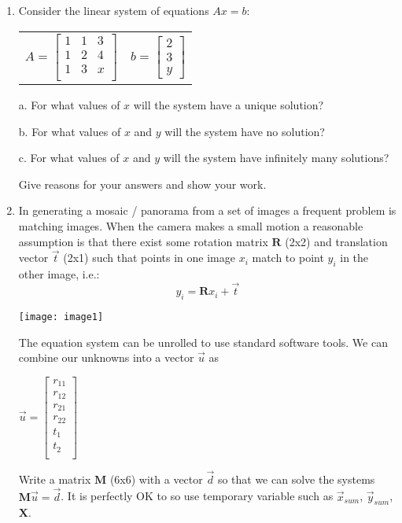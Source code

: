 \documentclass[12pt]{article}
\begin{document}
\begin{enumerate}
\item Consider the linear system of equations $Ax = b$:
  \begin{center}
    \begin{tabular}{cc}
      $
      A = \left[\begin{array}{ccc} 1 & 1 & 3 \\ 1 & 2 & 4\\1 & 3 & x\\\end{array}\right]
      $ &
      $ 
          b = \left[\begin{array}{c} 2 \\ 3 \\ y \end{array}\right]
      $
    \end{tabular}
  \end{center}
  
a. For what values of $x$ will the system have a unique solution?

b. For what values of $x$ and $y$ will the system have no solution?

c. For what values of $x$ and $y$ will the system have infinitely many solutions?

Give reasons for your answers and show your work.

\item In generating a mosaic / panorama from a set of images a
  frequent problem is matching images. When the camera makes a small
  motion a reasonable assumption is that there exist some rotation
  matrix $\mathbf R$ (2x2) and translation vector $\vec{t}$ (2x1) such
  that points in one image $x_i$ match to point $y_i$ in the other
  image, i.e.:
  \[
    y_i = {\mathbf R} x_i + \vec{t}
  \]
  \centerline{\texttt{[image: image1]}} 

  The equation system can be unrolled to use standard software
  tools. We can combine our unknowns into a vector $\vec{u}$ as
  \begin{center}
    $
    \vec{u} = \left[ \begin{array}{c}
                       r_{11} \\
                       r_{12} \\
                       r_{21} \\
                       r_{22} \\
                       t_1 \\
                       t_2 \\
                     \end{array} \right]
    $
  \end{center}
  Write a matrix $\mathbf M$ (6x6) with a vector $\vec{d}$ so that we
  can solve the systems ${\mathbf M} \vec{u} = \vec{d}$. It is
  perfectly OK to so use temporary variable such as $\vec{x}_{sum}$, $\vec{y}_{sum}$, $\mathbf X$. 
  

\end{enumerate}
\end{document}
